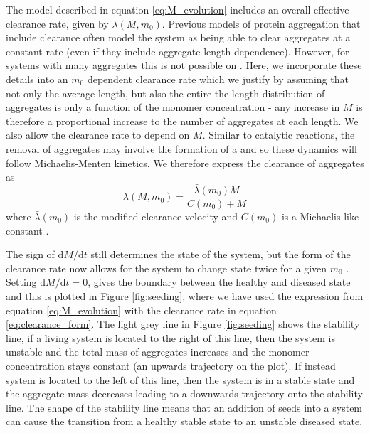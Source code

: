 The model described in equation \eqref{eq:M_evolution} includes an overall effective clearance rate, given by $\lambda(M, m_0)$. Previous models of protein aggregation that include clearance often model the system as being able to clear aggregates at a constant rate (even if they include aggregate length dependence). However, for systems with many aggregates this is not possible on . Here, we incorporate these details into an $m_0$ dependent clearance rate which we justify by assuming that not only the average length, but also the entire the length distribution of aggregates is only a function of the monomer concentration - any increase in $M$ is therefore a proportional increase to the number of aggregates at each length. We also allow the clearance rate to depend on $M$. Similar to catalytic reactions, the removal of aggregates may involve the formation of a  and so these dynamics will follow Michaelis-Menten kinetics. We therefore express the clearance of aggregates as
\begin{equation}
    \lambda(M, m_0) = \frac{\bar{\lambda}(m_0)M}{C(m_0) + M}
    \label{eq:clearance_form}
\end{equation}
where $\bar{\lambda}(m_0)$ is the modified clearance velocity and $C(m_0)$ is a Michaelis-like constant .

The sign of $\text{d}M/\text{d}t$ still determines the state of the system, but the form of the clearance rate now allows for the system to change state twice for a given $m_0$ . Setting $\text{d}M/\text{d}t = 0$, gives the boundary between the healthy and diseased state and this is plotted in Figure \ref{fig:seeding}, where we have used the expression from equation \eqref{eq:M_evolution} with the clearance rate in equation \eqref{eq:clearance_form}. The light grey line in Figure \ref{fig:seeding} shows the stability line, if a living system is located to the right of this line, then the system is unstable and the total mass of aggregates increases and the monomer concentration stays constant (an upwards trajectory on the plot). If instead system is located to the left of this line, then the system is in a stable state and the aggregate mass decreases leading to a downwards trajectory onto the stability line. The shape of the stability line means that an addition of seeds into a system can cause the transition from a healthy stable state to an unstable diseased state.


